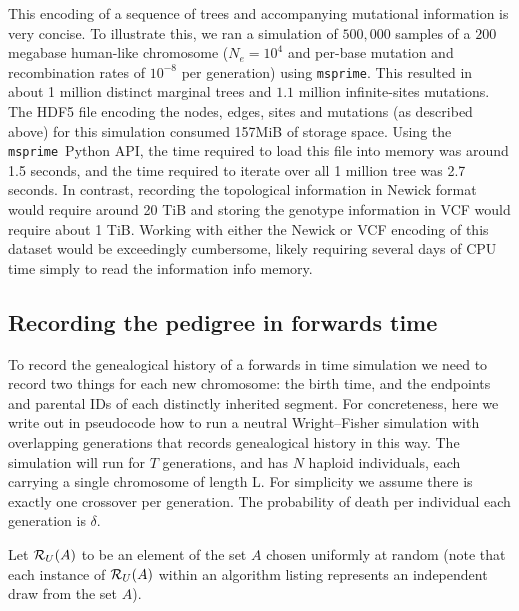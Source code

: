 \documentclass{article}
\newcommand{\msprime}{\texttt{msprime}}
\begin{document}
This encoding of a sequence of trees and accompanying mutational information is
very concise. To illustrate this, we ran a simulation of $500,000$ samples of a
$200$ megabase human-like chromosome ($N_e=10^4$ and per-base mutation and
recombination rates of $10^{-8}$ per generation) using \msprime. This resulted
in about 1 million distinct marginal trees and $1.1$ million infinite-sites
mutations. The HDF5 file encoding the nodes, edges, sites and mutations (as
described above) for this simulation consumed 157MiB of storage space. Using
the \msprime\ Python API, the time required to load this file into memory was
around 1.5 seconds, and the time required to iterate over all 1 million tree
was 2.7 seconds. In contrast, recording the topological information in Newick
format would require around 20 TiB and storing the genotype information
in VCF would require about 1 TiB. Working with either the Newick or VCF encoding
of this dataset would be exceedingly cumbersome, likely requiring several
days of CPU time simply to read the information info memory.


\subsection*{Recording the pedigree in forwards time}

To record the genealogical history of a forwards in time simulation
we need to record two things for each new chromosome:
the birth time, and the endpoints and parental IDs of each distinctly inherited segment.
For concreteness, here we write out in pseudocode how to run a neutral Wright--Fisher simulation
with overlapping generations that records genealogical history in this way.
The simulation will run for $T$ generations,
and has $N$ haploid individuals, each carrying a single chromosome of length L.
For simplicity we assume there is exactly one crossover per generation.
The probability of death per individual each generation is $\delta$.

Let $\mathcal{R}_U(A)$ to be an element of the set $A$ chosen
uniformly at random (note that each instance of $\mathcal{R}_U(A)$ within
an algorithm listing represents an independent draw from the set $A$).
\end{document}
